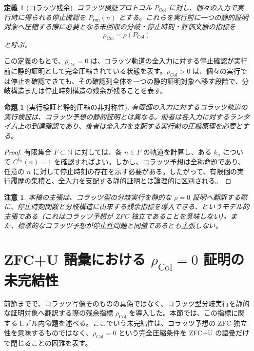 \documentclass[11pt,a4paper,ja=standard,autodetect-engine]{bxjsarticle}
\newtheorem{definition}{定義}
\newtheorem{proposition}{命題}
\newtheorem{remark}{注意}
\begin{document}
\begin{definition}[コラッツ残余]
コラッツ検証プロトコル $P_{\mathrm{Col}}$ に対し、個々の入力で実行時に得られる停止確認を $P_{\mathrm{run}}(n)$ とする。これらを実行前に一つの静的証明対象へ圧縮する際に必要となる未回収の分岐・停止時刻・評価文脈の指標を
\begin{equation}
    \rho_{\mathrm{Col}}=\rho(P_{\mathrm{Col}})
\end{equation}
と呼ぶ。
\end{definition}

この定義のもとで、$\rho_{\mathrm{Col}}=0$ は、コラッツ軌道の全入力に対する停止確認が実行前に静的証明として完全圧縮されている状態を表す。$\rho_{\mathrm{Col}}>0$ は、個々の実行では停止を確認できても、その確認列全体を一つの静的証明対象へ移す段階で、分岐構造または停止時刻構造の残余が残ることを表す。

\begin{proposition}[実行検証と静的圧縮の非対称性]
有限個の入力に対するコラッツ軌道の実行検証は、コラッツ予想の静的証明とは異なる。前者は各入力に対するランタイム上の到達確認であり、後者は全入力を支配する実行前の圧縮原理を必要とする。
\end{proposition}

\begin{proof}
有限集合 $F\subset\mathbb{N}$ に対しては、各 $n\in F$ の軌道を計算し、ある $k_{n}$ について $C^{k_{n}}(n)=1$ を確認すればよい。しかし、コラッツ予想は全称命題であり、任意の $n$ に対して停止時刻の存在を示す必要がある。したがって、有限個の実行履歴の集積と、全入力を支配する静的証明とは論理的に区別される。
\end{proof}

\begin{remark}
本稿の主張は、コラッツ型の分岐実行を静的な $\rho=0$ 証明へ翻訳する際に、停止時刻関数と分岐構造に由来する残余指標を導入できる、というモデル的主張である（これはコラッツ予想が ZFC 独立であることを意味しない）。また、標準的なコラッツ予想が停止性問題と同値であるとも主張しない。
\end{remark}


\section{ZFC+U 語彙における $\rho_{\mathrm{Col}}=0$ 証明の未完結性}

前節までで、コラッツ写像そのものの真偽ではなく、コラッツ型分岐実行を静的な証明対象へ翻訳する際の残余指標 $\rho_{\mathrm{Col}}$ を導入した。本節では、この指標に関するモデル内命題を述べる。ここでいう未完結性は、コラッツ予想の ZFC 独立性を意味するものではなく、$\rho_{\mathrm{Col}}=0$ という完全圧縮条件を ZFC+U の語彙だけで閉じることの困難を表す。
\end{document}
